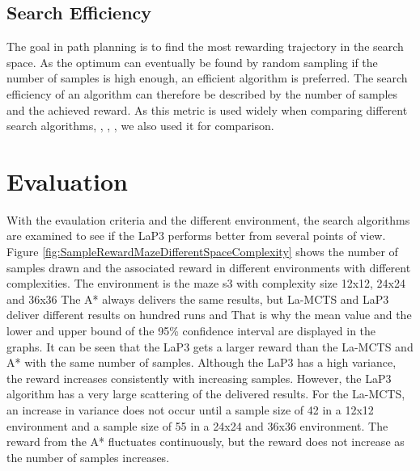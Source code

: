 \documentclass[bibliography=totoc]{scrartcl}
\begin{document}
\subsection{Search Efficiency}
The goal in path planning is to find the most rewarding trajectory in the search space.
As the optimum can eventually be found by random sampling if the number of samples is high enough, an efficient algorithm is preferred.
The search efficiency of an algorithm can therefore be described by the number of samples and the achieved reward.
As this metric is used widely when comparing different search algorithms, \cite{La-MCTS}, \cite{LaNAS}, \cite{VOOT}, we also used it for comparison.



\section{Evaluation}


With the evaulation criteria and the different environment, the search algorithms are examined to see if the \ac{LaP3} performs better from several points of view.
Figure \ref{fig:SampleRewardMazeDifferentSpaceComplexity} shows the number of samples drawn and the associated reward in different environments with different complexities.
The environment is the maze s3 with complexity size 12x12, 24x24 and 36x36
The A* always delivers the same results, but \ac{La-MCTS} and \ac{LaP3} deliver different results on hundred runs and 
That is why the mean value and the lower and upper bound of the 95\% confidence interval are displayed in the graphs.
It can be seen that the \ac{LaP3} gets a larger reward than the \ac{La-MCTS} and A* with the same number of samples.
Although the \ac{LaP3} has a high variance, the reward increases consistently with increasing samples.
However, the \ac{LaP3} algorithm has a very large scattering of the delivered results.
For the \ac{La-MCTS}, an increase in variance does not occur until a sample size of 42 in a 12x12 environment and a sample size of 55 in a 24x24 and 36x36 environment.
The reward from the A* fluctuates continuously, but the reward does not increase as the number of samples increases.
\end{document}
